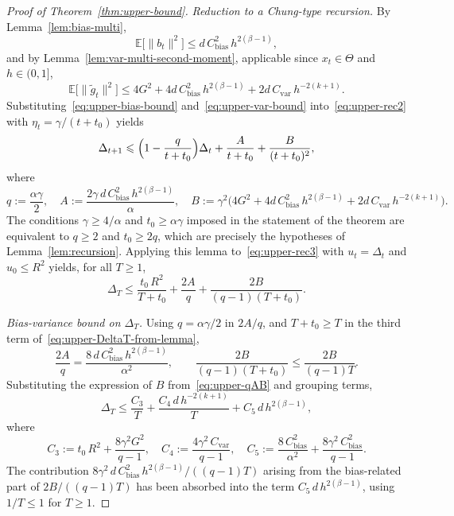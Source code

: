 \documentclass[10pt,a4paper]{amsart}
\renewcommand{\geq}{\geqslant}
\renewcommand{\leq}{\leqslant}
\begin{document}
\begin{proof}[Proof of Theorem~\ref{thm:upper-bound}]
\medskip
\noindent\textit{Reduction to a Chung-type recursion.}
By Lemma~\ref{lem:bias-multi}, 
\begin{equation}
\label{eq:upper-bias-bound}
\mathbb{E}\bigl[\|b_t\|^2\bigr]
\leq d\,C_{\mathrm{bias}}^2\,h^{2(\beta-1)},
\end{equation}
and by Lemma~\ref{lem:var-multi-second-moment}, applicable since 
$x_t\in\Theta$ and $h\in(0,1]$,
\begin{equation}
\label{eq:upper-var-bound}
\mathbb{E}\bigl[\|\tilde{g}_t\|^2\bigr]
\leq 4G^2+4d\,C_{\mathrm{bias}}^2\,h^{2(\beta-1)}
+2d\,C_{\mathrm{var}}\,h^{-2(k+1)}.
\end{equation}
Substituting~\eqref{eq:upper-bias-bound} 
and~\eqref{eq:upper-var-bound} into~\eqref{eq:upper-rec2} with 
$\eta_t=\gamma/(t+t_0)$ yields
\begin{equation}
\label{eq:upper-rec3}
\Delta_{t+1}\leq\Bigl(1-\frac{q}{t+t_0}\Bigr)\Delta_t
+\frac{A}{t+t_0}+\frac{B}{(t+t_0)^2},
\end{equation}
where 
\begin{equation}
\label{eq:upper-qAB}
q:=\frac{\alpha\gamma}{2},\quad
A:=\frac{2\gamma\,d\,C_{\mathrm{bias}}^2\,h^{2(\beta-1)}}{\alpha},\quad
B:=\gamma^2\bigl(4G^2+4d\,C_{\mathrm{bias}}^2\,h^{2(\beta-1)}
+2d\,C_{\mathrm{var}}\,h^{-2(k+1)}\bigr).
\end{equation}
The conditions $\gamma\geq 4/\alpha$ and $t_0\geq\alpha\gamma$ 
imposed in the statement of the theorem are equivalent to $q\geq 2$ 
and $t_0\geq 2q$, which are precisely the hypotheses of 
Lemma~\ref{lem:recursion}. Applying this lemma 
to~\eqref{eq:upper-rec3} with $u_t=\Delta_t$ and $u_0\leq R^2$ 
yields, for all $T\geq 1$,
\begin{equation}
\label{eq:upper-DeltaT-from-lemma}
\Delta_T\leq\frac{t_0\,R^2}{T+t_0}
+\frac{2A}{q}
+\frac{2B}{(q-1)(T+t_0)}.
\end{equation}

\medskip
\noindent\textit{Bias-variance bound on $\Delta_T$.}
Using $q=\alpha\gamma/2$ in $2A/q$, and $T+t_0\geq T$ in the third 
term of~\eqref{eq:upper-DeltaT-from-lemma},
\[
\frac{2A}{q}=\frac{8\,d\,C_{\mathrm{bias}}^2\,h^{2(\beta-1)}}{\alpha^2},
\qquad
\frac{2B}{(q-1)(T+t_0)}\leq\frac{2B}{(q-1)T}.
\]
Substituting the expression of $B$ from~\eqref{eq:upper-qAB} and 
grouping terms,
\begin{equation}
\label{eq:upper-DeltaT-grouped}
\Delta_T\leq\frac{C_3}{T}+\frac{C_4\,d\,h^{-2(k+1)}}{T}
+C_5\,d\,h^{2(\beta-1)},
\end{equation}
where 
\begin{equation}
\label{eq:upper-C345}
C_3:=t_0\,R^2+\frac{8\gamma^2 G^2}{q-1},\quad
C_4:=\frac{4\gamma^2\,C_{\mathrm{var}}}{q-1},\quad
C_5:=\frac{8\,C_{\mathrm{bias}}^2}{\alpha^2}
+\frac{8\gamma^2\,C_{\mathrm{bias}}^2}{q-1}.
\end{equation}
The contribution 
$8\gamma^2\,d\,C_{\mathrm{bias}}^2\,h^{2(\beta-1)}/((q-1)T)$ 
arising from the bias-related part of 
$2B/((q-1)T)$ has been absorbed into the term 
$C_5\,d\,h^{2(\beta-1)}$, using $1/T\leq 1$ for $T\geq 1$.


\end{proof}
\end{document}

